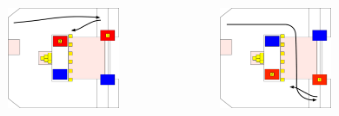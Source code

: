 \documentclass{beamer}
\begin{document}
\begin{frame}
\begin{columns}
\begin{figure}
  \end{figure}
  \begin{figure}
   \includegraphics[scale=0.15]{assets/paths/13_LL}
  \end{figure}
  \begin{figure}
   \includegraphics[scale=0.15]{assets/paths/13_RR}
  \end{figure}
 \end{columns}
\end{frame}
\end{document}
